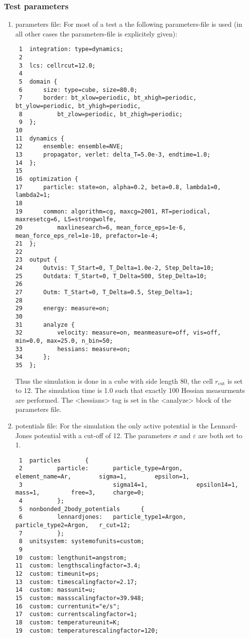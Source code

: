 \documentclass[a4paper]{article}
\begin{document}
\subsubsection{Test parameters}
\label{sec-1-2-1}
\begin{enumerate}
\item parameters file:
\label{sec-1-2-1-1}
For most of a test a the following parameters-file is used (in all other cases the parameters-file is explicitely given):
\begin{verbatim}
 1  integration: type=dynamics;
 2
 3  lcs: cellrcut=12.0;
 4
 5  domain {
 6      size: type=cube, size=80.0;
 7      border: bt_xlow=periodic, bt_xhigh=periodic, bt_ylow=periodic, bt_yhigh=periodic,
 8          bt_zlow=periodic, bt_zhigh=periodic;
 9  };
10
11  dynamics {
12      ensemble: ensemble=NVE;
13      propagator, verlet: delta_T=5.0e-3, endtime=1.0;
14  };
15
16  optimization {
17      particle: state=on, alpha=0.2, beta=0.8, lambda1=0, lambda2=1;
18
19      common: algorithm=cg, maxcg=2001, RT=periodical, maxresetcg=6, LS=strongwolfe,
20          maxlinesearch=6, mean_force_eps=1e-6, mean_force_eps_rel=1e-10, prefactor=1e-4;
21  };
22
23  output {
24      Outvis: T_Start=0, T_Delta=1.0e-2, Step_Delta=10;
25      Outdata: T_Start=0, T_Delta=500, Step_Delta=10;
26
27      Outm: T_Start=0, T_Delta=0.5, Step_Delta=1;
28
29      energy: measure=on;
30
31      analyze {
32          velocity: measure=on, meanmeasure=off, vis=off, min=0.0, max=25.0, n_bin=50;
33          hessians: measure=on;
34      };
35  };
\end{verbatim}
Thus the simulation is done in a cube with side length 80, the cell \(r_{\textrm{cut}}\) is set to 12.
The simulation time is 1.0 such that exactly 100 Hessian measurments are performed.
The <hessians> tag is set in the <analyze> block of the parameters file.
\item potentials file:
\label{sec-1-2-1-2}
For the simulation the only active potential is the Lennard-Jones potential with a cut-off of 12.
The parameters $\sigma$ and $\varepsilon$ are both set to 1.
\begin{verbatim}
 1  particles       {
 2          particle:       particle_type=Argon,    element_name=Ar,        sigma=1,        epsilon=1,
 3                          sigma14=1,              epsilon14=1,            mass=1,         free=3,     charge=0;
 4          };
 5  nonbonded_2body_potentials      {
 6          lennardjones:   particle_type1=Argon,   particle_type2=Argon,   r_cut=12;
 7          };
 8  unitsystem: systemofunits=custom;
 9
10  custom: lengthunit=angstrom;
11  custom: lengthscalingfactor=3.4;
12  custom: timeunit=ps;
13  custom: timescalingfactor=2.17;
14  custom: massunit=u;
15  custom: massscalingfactor=39.948;
16  custom: currentunit="e/s";
17  custom: currentscalingfactor=1;
18  custom: temperatureunit=K;
19  custom: temperaturescalingfactor=120;
\end{verbatim}
\end{enumerate}
\end{document}
